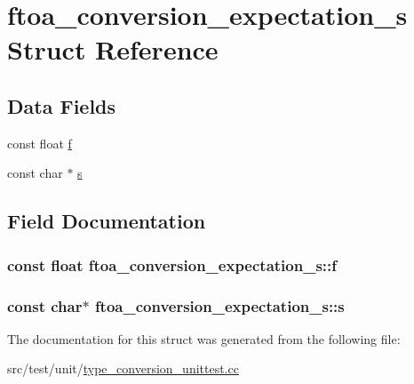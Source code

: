 \hypertarget{structftoa__conversion__expectation__s}{\section{ftoa\+\_\+conversion\+\_\+expectation\+\_\+s Struct Reference}
\label{structftoa__conversion__expectation__s}
}
\subsection*{Data Fields}
\begin{DoxyCompactItemize}
\item 
const float \hyperlink{structftoa__conversion__expectation__s_a1c7681e2d7c763b101c7f6f072952016}{f}
\item 
const char $\ast$ \hyperlink{structftoa__conversion__expectation__s_aeeeaa00faf2393b431410a7cb4838e1f}{s}
\end{DoxyCompactItemize}


\subsection{Field Documentation}
\hypertarget{structftoa__conversion__expectation__s_a1c7681e2d7c763b101c7f6f072952016}{
\subsubsection[{f}]{\setlength{\rightskip}{0pt plus 5cm}const float ftoa\+\_\+conversion\+\_\+expectation\+\_\+s\+::f}}\label{structftoa__conversion__expectation__s_a1c7681e2d7c763b101c7f6f072952016}
\hypertarget{structftoa__conversion__expectation__s_aeeeaa00faf2393b431410a7cb4838e1f}{
\subsubsection[{s}]{\setlength{\rightskip}{0pt plus 5cm}const char$\ast$ ftoa\+\_\+conversion\+\_\+expectation\+\_\+s\+::s}}\label{structftoa__conversion__expectation__s_aeeeaa00faf2393b431410a7cb4838e1f}


The documentation for this struct was generated from the following file\+:\begin{DoxyCompactItemize}
\item 
src/test/unit/\hyperlink{type__conversion__unittest_8cc}{type\+\_\+conversion\+\_\+unittest.\+cc}\end{DoxyCompactItemize}
